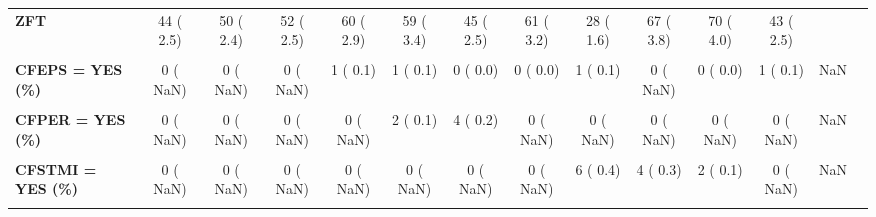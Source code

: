 \documentclass[
]{article}
\begin{document}
\begin{table}[H]
\begin{tabular}[t]{>{\raggedright\arraybackslash}p{5em}ccccccccccccc}
\textbf{ZFT} & 44 (  2.5) & 50 (  2.4) & 52 (  2.5) & 60 (  2.9) & 59 (  3.4) & 45 (  2.5) & 61 (  3.2) & 28 (  1.6) & 67 (  3.8) & 70 (  4.0) & 43 (  2.5) &  & \\
\textbf{\cellcolor{gray!10}{CFAP = YES (\%)}} & \cellcolor{gray!10}{0 (  NaN)} & \cellcolor{gray!10}{0 (  NaN)} & \cellcolor{gray!10}{0 (  NaN)} & \cellcolor{gray!10}{102 (  5.5)} & \cellcolor{gray!10}{67 (  4.0)} & \cellcolor{gray!10}{35 (  2.1)} & \cellcolor{gray!10}{64 (  4.7)} & \cellcolor{gray!10}{54 (  3.5)} & \cellcolor{gray!10}{0 (  NaN)} & \cellcolor{gray!10}{43 (  3.0)} & \cellcolor{gray!10}{31 (  2.8)} & \cellcolor{gray!10}{NaN} & \cellcolor{gray!10}{}\\
\textbf{CFEPS = YES (\%)} & 0 (  NaN) & 0 (  NaN) & 0 (  NaN) & 1 (  0.1) & 1 (  0.1) & 0 (  0.0) & 0 (  0.0) & 1 (  0.1) & 0 (  NaN) & 0 (  0.0) & 1 (  0.1) & NaN & \\
\textbf{\cellcolor{gray!10}{CFICD = YES (\%)}} & \cellcolor{gray!10}{0 (  NaN)} & \cellcolor{gray!10}{0 (  NaN)} & \cellcolor{gray!10}{0 (  NaN)} & \cellcolor{gray!10}{4 (  0.2)} & \cellcolor{gray!10}{2 (  0.1)} & \cellcolor{gray!10}{0 (  0.0)} & \cellcolor{gray!10}{2 (  0.1)} & \cellcolor{gray!10}{2 (  0.1)} & \cellcolor{gray!10}{0 (  NaN)} & \cellcolor{gray!10}{5 (  0.3)} & \cellcolor{gray!10}{6 (  0.5)} & \cellcolor{gray!10}{NaN} & \cellcolor{gray!10}{}\\
\textbf{CFPER = YES (\%)} & 0 (  NaN) & 0 (  NaN) & 0 (  NaN) & 0 (  NaN) & 2 (  0.1) & 4 (  0.2) & 0 (  NaN) & 0 (  NaN) & 0 (  NaN) & 0 (  NaN) & 0 (  NaN) & NaN & \\
\textbf{\cellcolor{gray!10}{CFPM = YES (\%)}} & \cellcolor{gray!10}{0 (  NaN)} & \cellcolor{gray!10}{0 (  NaN)} & \cellcolor{gray!10}{0 (  NaN)} & \cellcolor{gray!10}{4 (  0.2)} & \cellcolor{gray!10}{3 (  0.2)} & \cellcolor{gray!10}{1 (  0.1)} & \cellcolor{gray!10}{4 (  0.3)} & \cellcolor{gray!10}{1 (  0.1)} & \cellcolor{gray!10}{0 (  NaN)} & \cellcolor{gray!10}{2 (  0.1)} & \cellcolor{gray!10}{1 (  0.1)} & \cellcolor{gray!10}{NaN} & \cellcolor{gray!10}{}\\
\textbf{CFSTMI = YES (\%)} & 0 (  NaN) & 0 (  NaN) & 0 (  NaN) & 0 (  NaN) & 0 (  NaN) & 0 (  NaN) & 0 (  NaN) & 6 (  0.4) & 4 (  0.3) & 2 (  0.1) & 0 (  NaN) & NaN & \\
\textbf{\cellcolor{gray!10}{CFTHR = YES (\%)}} & \cellcolor{gray!10}{0 (  NaN)} & \cellcolor{gray!10}{0 (  NaN)} & \cellcolor{gray!10}{0 (  NaN)} & \cellcolor{gray!10}{0 (  NaN)} & \cellcolor{gray!10}{13 (  0.8)} & \cellcolor{gray!10}{6 (  0.4)} & \cellcolor{gray!10}{6 (  0.4)} & \cellcolor{gray!10}{5 (  0.3)} & \cellcolor{gray!10}{0 (  NaN)} & \cellcolor{gray!10}{2 (  0.1)} & \cellcolor{gray!10}{4 (  0.4)} & \cellcolor{gray!10}{NaN} & \cellcolor{gray!10}{}\\

\end{tabular}
\end{table}
\end{document}
